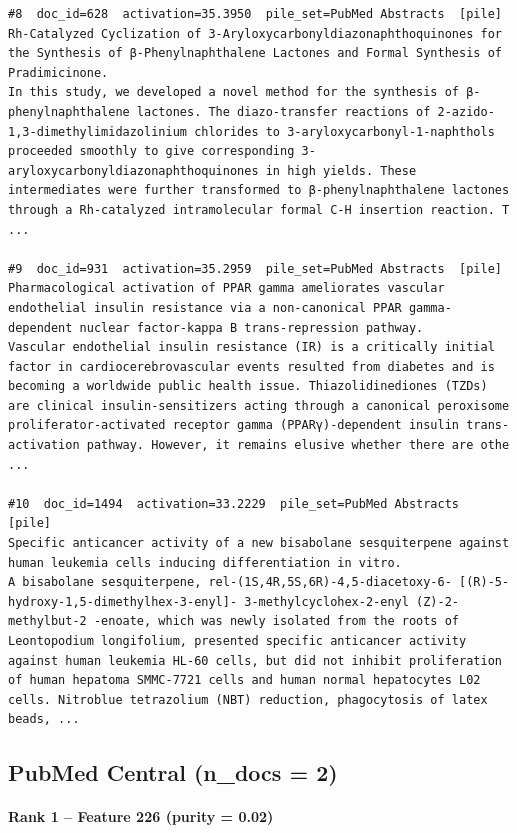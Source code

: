 \begin{verbatim}
#8  doc_id=628  activation=35.3950  pile_set=PubMed Abstracts  [pile]
Rh-Catalyzed Cyclization of 3-Aryloxycarbonyldiazonaphthoquinones for the Synthesis of β-Phenylnaphthalene Lactones and Formal Synthesis of Pradimicinone.
In this study, we developed a novel method for the synthesis of β-phenylnaphthalene lactones. The diazo-transfer reactions of 2-azido-1,3-dimethylimidazolinium chlorides to 3-aryloxycarbonyl-1-naphthols proceeded smoothly to give corresponding 3-aryloxycarbonyldiazonaphthoquinones in high yields. These intermediates were further transformed to β-phenylnaphthalene lactones through a Rh-catalyzed intramolecular formal C-H insertion reaction. T ...

#9  doc_id=931  activation=35.2959  pile_set=PubMed Abstracts  [pile]
Pharmacological activation of PPAR gamma ameliorates vascular endothelial insulin resistance via a non-canonical PPAR gamma-dependent nuclear factor-kappa B trans-repression pathway.
Vascular endothelial insulin resistance (IR) is a critically initial factor in cardiocerebrovascular events resulted from diabetes and is becoming a worldwide public health issue. Thiazolidinediones (TZDs) are clinical insulin-sensitizers acting through a canonical peroxisome proliferator-activated receptor gamma (PPARγ)-dependent insulin trans-activation pathway. However, it remains elusive whether there are othe ...

#10  doc_id=1494  activation=33.2229  pile_set=PubMed Abstracts  [pile]
Specific anticancer activity of a new bisabolane sesquiterpene against human leukemia cells inducing differentiation in vitro.
A bisabolane sesquiterpene, rel-(1S,4R,5S,6R)-4,5-diacetoxy-6- [(R)-5-hydroxy-1,5-dimethylhex-3-enyl]- 3-methylcyclohex-2-enyl (Z)-2-methylbut-2 -enoate, which was newly isolated from the roots of Leontopodium longifolium, presented specific anticancer activity against human leukemia HL-60 cells, but did not inhibit proliferation of human hepatoma SMMC-7721 cells and human normal hepatocytes L02 cells. Nitroblue tetrazolium (NBT) reduction, phagocytosis of latex beads, ...

\end{verbatim}

\subsection*{PubMed Central (n\_docs = 2)}

\paragraph*{Rank 1 -- Feature 226 (purity = 0.02)}

